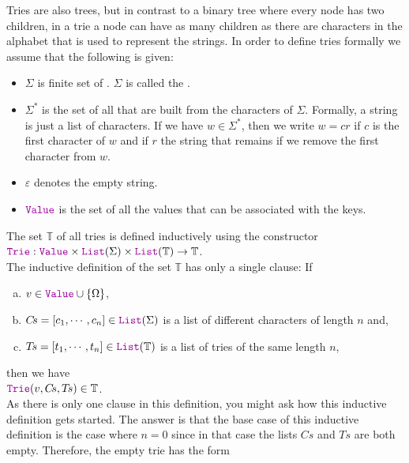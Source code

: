 Tries are also trees, but in contrast to a binary tree where every node has two children, in a trie a
node can have as many children as there are characters in the alphabet that is used to represent the
strings.  In order to define tries formally we assume that the following is given:
\begin{itemize}
\item $\Sigma$ is finite set of . $\Sigma$ is called the
      . 
\item $\Sigma^*$ is the set of all  that are built from the characters of $\Sigma$.
      Formally, a string is just a list of characters.  If we have $w \in \Sigma^*$, then we write $w = cr$
      if $c$ is the first character of $w$ and if $r$ the string that remains if we remove the first
      character from $w$.
\item $\varepsilon$ denotes the empty string.
\item $\mytt{Value}$ is the set of all the values that can be associated with the keys.  
\end{itemize}
The set $\mathbb{T}$ of all tries  is defined inductively using the constructor \\[0.2cm]
\hspace*{1.3cm} 
$\mytt{Trie}: \mytt{Value} \times \mytt{List}(\Sigma) \times
\mytt{List}(\mathbb{T}) \rightarrow \mathbb{T}$. 
\\[0.2cm]
The inductive definition of the set $\mathbb{T}$  has only a single clause: If
\begin{enumerate}[(a)]
\item $v \in \mytt{Value} \cup \{\Omega\}$,
\item $C\!s = [c_1, \cdots, c_n] \in \mytt{List}(\Sigma)$ is a list of different characters of length
      $n$ and,
\item $T\!s = [t_1, \cdots, t_n] \in \mytt{List}(\mathbb{T})$ is a list of  tries of the same length $n$, 
\end{enumerate}
then we have 
\\[0.2cm]
\hspace*{1.3cm}  $\mytt{Trie}(v, C\!s, T\!s) \in \mathbb{T}$.  
\\[0.2cm]
As there is only one clause in this definition, you might ask how this inductive definition gets started.
The answer is that the base case of this inductive definition is the case where
$n=0$ since in that case the lists  $C\!s$ and $T\!s$ are both empty.  Therefore, the empty trie has the form
